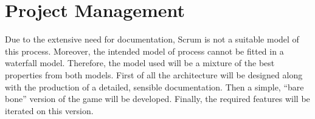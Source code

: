 \section{Project Management}

Due to the extensive need for documentation, Scrum is not a suitable model of this process. Moreover, the intended model of process cannot be fitted in a waterfall model. Therefore, the model used will be a mixture of the best properties from both models. First of all the architecture will be designed along with the production of a detailed, sensible documentation. Then a simple, “bare bone” version of the game will be 
developed. Finally, the required features will be iterated on this version.
